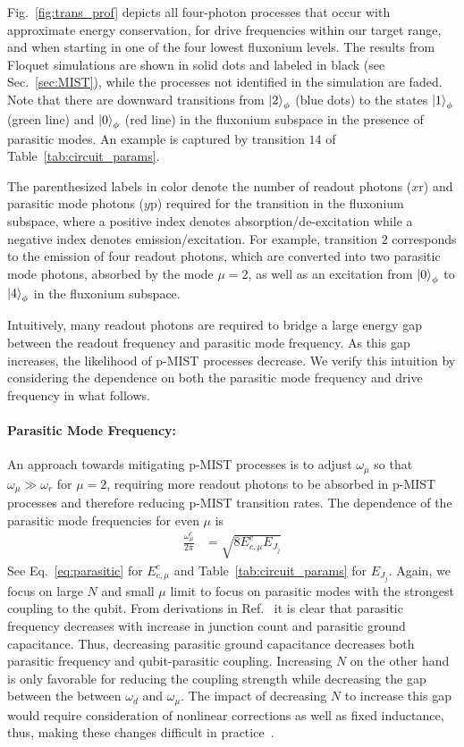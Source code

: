 \documentclass[%
reprint,
superscriptaddress,
 amsmath,amssymb,
 aps,
 prx,
longbibliography,
floatfix,
]{revtex4-2}
\begin{document}
Fig.~\ref{fig:trans_prof} depicts all four-photon processes that occur with approximate energy conservation, for drive frequencies within our target range, and when starting in one of the four lowest fluxonium levels. The results from Floquet simulations are  shown in solid dots and labeled in black (see Sec.~\ref{sec:MIST}), while the processes not identified in the simulation are faded. Note that there are downward transitions from $\ket{2}_\phi$ (blue dots) to the states $\ket{1}_\phi$ (green line) and $\ket{0}_\phi$ (red line) in the fluxonium subspace in the presence of parasitic modes. An example is captured by transition $14$ of Table~\ref{tab:circuit_params}. 

The parenthesized labels in color denote the number of readout photons ($x \mathrm{r}$) and parasitic mode photons ($y\mathrm{p}$) required for the transition in the fluxonium subspace, where a positive index denotes absorption/de-excitation while a negative index denotes emission/excitation. For example, transition $2$ corresponds to the emission of four readout photons, which are converted into two parasitic mode photons, absorbed by the mode $\mu=2$, as well as an excitation from $\ket{0}_\phi$ to $\ket{4}_\phi$ in the fluxonium subspace. 

Intuitively, many readout photons are required to bridge a large energy gap between the readout frequency and parasitic mode frequency. As this gap increases, the likelihood of p-MIST processes decrease. We verify this intuition
by considering the dependence on both the parasitic mode frequency and drive frequency in what follows.  


\paragraph{Parasitic Mode Frequency:}
An approach towards mitigating p-MIST processes is to adjust $\omega_\mu$ so that $\omega_\mu \gg\omega_r$ for $\mu=2$, requiring more readout photons to be absorbed in p-MIST processes and therefore reducing p-MIST transition rates. The dependence of the parasitic mode frequencies for even $\mu$ is
\begin{align}
    \frac{\omega_\mu^e}{2\pi}&=\sqrt{8E_{c,\mu}^e E_{J_j}}
\end{align}
 See Eq.~\ref{eq:parasitic} for $E_{c,\mu}^e$ and Table~\ref{tab:circuit_params} for $E_{J_j}$. Again, we focus on large $N$ and small $\mu$ limit to focus on parasitic modes with the strongest coupling to the qubit. From derivations in Ref.~\cite{viola2015collective} it is clear that parasitic frequency decreases with increase in junction count and 
 parasitic ground capacitance. Thus, decreasing parasitic ground capacitance decreases both parasitic frequency and qubit-parasitic coupling. Increasing $N$ on the other hand is only favorable for reducing the coupling strength while decreasing the gap between the between $\omega_d$ and $\omega_\mu$. The impact of decreasing $N$ to increase this gap would require consideration of nonlinear corrections as well as fixed inductance, thus, making these changes difficult in practice~\cite{viola2015collective}. 
\end{document}
